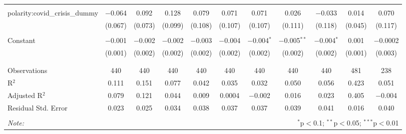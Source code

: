 \begin{table}[!htbp]
\begin{adjustbox}{width=1.25\textwidth}
\begin{tabular}{@{\extracolsep{5pt}}lcccccccccc}
  & & & & & & & & & & \\ 
 polarity:covid\_crisis\_dummy & $-$0.064 & 0.092 & 0.128 & 0.079 & 0.071 & 0.071 & 0.026 & $-$0.033 & 0.014 & 0.070 \\ 
  & (0.067) & (0.073) & (0.099) & (0.108) & (0.107) & (0.107) & (0.111) & (0.118) & (0.045) & (0.117) \\ 
  & & & & & & & & & & \\ 
 Constant & $-$0.001 & $-$0.002 & $-$0.002 & $-$0.003 & $-$0.004 & $-$0.004$^{*}$ & $-$0.005$^{**}$ & $-$0.004$^{*}$ & 0.001 & $-$0.0002 \\ 
  & (0.001) & (0.002) & (0.002) & (0.002) & (0.002) & (0.002) & (0.002) & (0.002) & (0.001) & (0.003) \\ 
  & & & & & & & & & & \\ 
\hline \\[-1.8ex] 
Observations & 440 & 440 & 440 & 440 & 440 & 440 & 440 & 440 & 481 & 238 \\ 
R$^{2}$ & 0.111 & 0.151 & 0.077 & 0.042 & 0.035 & 0.032 & 0.050 & 0.056 & 0.423 & 0.051 \\ 
Adjusted R$^{2}$ & 0.079 & 0.121 & 0.044 & 0.009 & 0.0004 & $-$0.002 & 0.016 & 0.023 & 0.405 & $-$0.004 \\ 
Residual Std. Error & 0.023 & 0.025 & 0.034 & 0.038 & 0.037 & 0.037 & 0.039 & 0.041 & 0.016 & 0.040 \\ 
\hline 
\hline \\[-1.8ex] 
\textit{Note:}& \multicolumn{10}{r}{$^{*}$p$<$0.1; $^{**}$p$<$0.05; $^{***}$p$<$0.01} \\ 
\end{tabular} 
\end{adjustbox} 
\end{table} 
